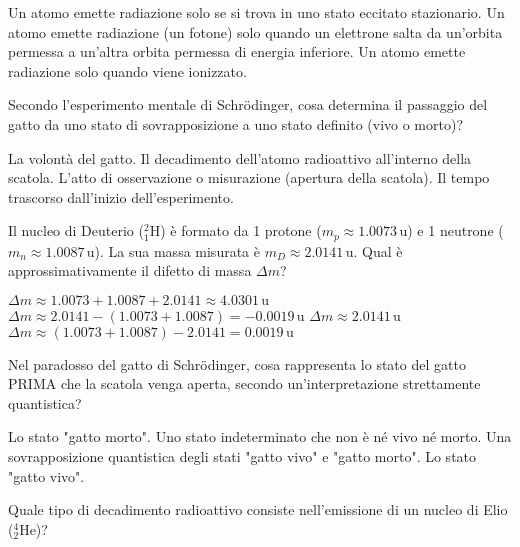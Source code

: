 \documentclass{exam}%
\begin{document}
\begin{questions}
\begin{choices}
\choice Un atomo emette radiazione solo se si trova in uno stato eccitato stazionario.%
\choice Un atomo emette radiazione (un fotone) solo quando un elettrone salta da un'orbita permessa a un'altra orbita permessa di energia inferiore.%
\choice Un atomo emette radiazione solo quando viene ionizzato.%
\end{choices}%
\question Secondo l'esperimento mentale di Schrödinger, cosa determina il passaggio del gatto da uno stato di sovrapposizione a uno stato definito (vivo o morto)?%
\vspace{0.2em}%
\begin{choices}%
\choice La volontà del gatto.%
\choice Il decadimento dell'atomo radioattivo all'interno della scatola.%
\choice L'atto di osservazione o misurazione (apertura della scatola).%
\choice Il tempo trascorso dall'inizio dell'esperimento.%
\end{choices}%
\question Il nucleo di Deuterio ($^2_1\text{H}$) è formato da 1 protone ($m_p \approx 1.0073 \, \text{u}$) e 1 neutrone ($m_n \approx 1.0087 \, \text{u}$). La sua massa misurata è $m_D \approx 2.0141 \, \text{u}$. Qual è approssimativamente il difetto di massa $\Delta m$?%
\vspace{0.2em}%
\begin{multicols}{2}%
\begin{choices}%
\choice $\Delta m \approx 1.0073 + 1.0087 + 2.0141 \approx 4.0301 \, \text{u}$%
\choice $\Delta m \approx 2.0141 - (1.0073 + 1.0087) = -0.0019 \, \text{u}$%
\choice $\Delta m \approx 2.0141 \, \text{u}$%
\choice $\Delta m \approx (1.0073 + 1.0087) - 2.0141 = 0.0019 \, \text{u}$%
\end{choices}%
\end{multicols}%
\question Nel paradosso del gatto di Schrödinger, cosa rappresenta lo stato del gatto PRIMA che la scatola venga aperta, secondo un'interpretazione strettamente quantistica?%
\vspace{0.2em}%
\begin{choices}%
\choice Lo stato "gatto morto".%
\choice Uno stato indeterminato che non è né vivo né morto.%
\choice Una sovrapposizione quantistica degli stati "gatto vivo" e "gatto morto".%
\choice Lo stato "gatto vivo".%
\end{choices}%
\question Quale tipo di decadimento radioattivo consiste nell'emissione di un nucleo di Elio ($^4_2\text{He}$)?%
\vspace{0.2em}%
\begin{multicols}{2}%
\begin{choices}%

\end{choices}
\end{multicols}
\end{questions}
\end{document}
